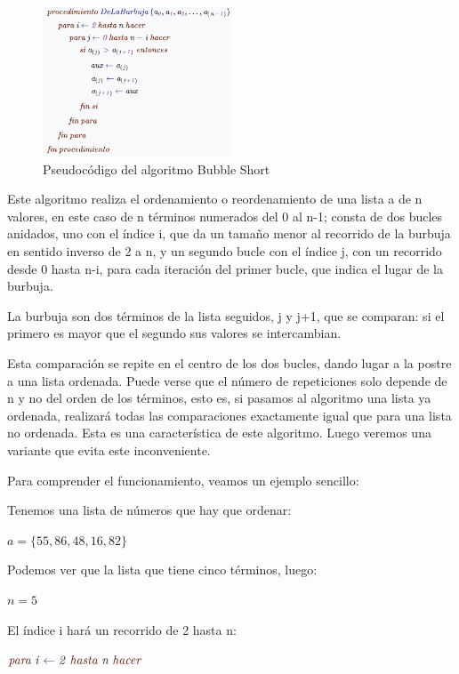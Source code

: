 \documentclass[8pt, A4]{article}    %
\newcommand\tab[1][1cm]{\hspace*{#1}}
\begin{document}
\begin{figure}[h]
\begin{center}
\includegraphics[width=0.5\textwidth]{graph/bubble-short-code}
\end{center}
\caption{Pseudocódigo del algoritmo Bubble Short}
\label{fig:BubbleSortCode}
\end{figure}

Este algoritmo realiza el ordenamiento o reordenamiento de una lista a de n valores, en este caso de n términos numerados del 0 al n-1; consta de dos bucles anidados, uno con el índice i, que da un tamaño menor al recorrido de la burbuja en sentido inverso de 2 a n, y un segundo bucle con el índice j, con un recorrido desde 0 hasta n-i, para cada iteración del primer bucle, que indica el lugar de la burbuja.

La burbuja son dos términos de la lista seguidos, j y j+1, que se comparan: si el primero es mayor que el segundo sus valores se intercambian.

Esta comparación se repite en el centro de los dos bucles, dando lugar a la postre a una lista ordenada. Puede verse que el número de repeticiones solo depende de n y no del orden de los términos, esto es, si pasamos al algoritmo una lista ya ordenada, realizará todas las comparaciones exactamente igual que para una lista no ordenada. Esta es una característica de este algoritmo. Luego veremos una variante que evita este inconveniente.

Para comprender el funcionamiento, veamos un ejemplo sencillo:

Tenemos una lista de números que hay que ordenar:

\tab ${\displaystyle a=\{55,86,48,16,82\}\,}$

Podemos ver que la lista que tiene cinco términos, luego:

\tab ${\displaystyle n=5\,}$

El índice i hará un recorrido de 2 hasta n:

\tab ${\displaystyle {\color {Sepia}{\mathit {para}}}\;{\color {Black}{\mathit {i}}}\;{\color {BlueViolet}{\mathit {\gets }}}\;{\color {Black}{\mathit {2}}}\;{\color {Sepia}{\mathit {hasta}}}\;{\color {Black}{\mathit {n}}}\;{\color {Sepia}{\mathit {hacer}}}}$
\end{document}
